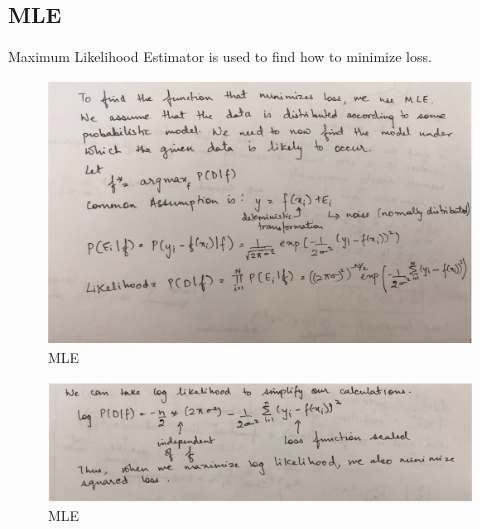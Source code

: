\subsection{MLE}
Maximum Likelihood Estimator is used to find how to minimize loss.
\begin{figure}[!ht]
  \begin{center}
    \includegraphics[scale=0.8]{figures/3.png}
    \caption{MLE }
    \label{fig:3}
  \end{center}
\end{figure}

\begin{figure}[!ht]
  \begin{center}
    \includegraphics[scale=0.8]{figures/4.png}
    \caption{MLE }
    \label{fig:4}
  \end{center}
\end{figure}
\newpage
